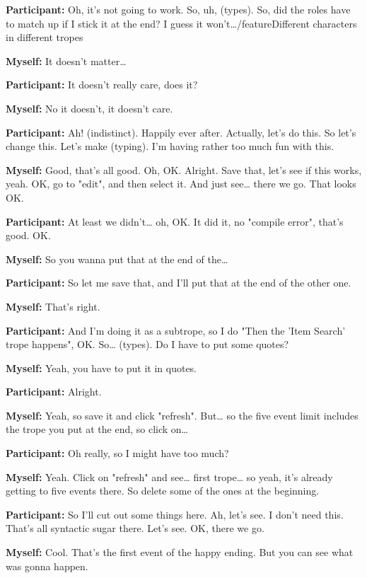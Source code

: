 \documentclass[11pt]{report}
\begin{document}
\begin{linenumbers}
\textbf{Participant:} Oh, it's not going to work. So, uh, (types). So, did the
roles have to match up if I stick it at the end? I guess it
won't\ldots{}/feature{Different characters in different tropes}

\textbf{Myself:} It doesn't matter\ldots{}

\textbf{Participant:} It doesn't really care, does it?

\textbf{Myself:} No it doesn't, it doesn't care.

\textbf{Participant:} Ah! (indistinct). Happily ever after. Actually, let's do this. So let's change this. Let's make (typing). I'm having rather too much fun with this.

\textbf{Myself:} Good, that's all good. Oh, OK. Alright. Save that, let's see if this works, yeah. OK, go to "edit", and then select it. And just see\ldots{} there we go. That looks OK.

\textbf{Participant:} At least we didn't\ldots{} oh, OK. It did it, no "compile error", that's good. OK.

\textbf{Myself:} So you wanna put that at the end of the\ldots{}

\textbf{Participant:} So let me save that, and I'll put that at the end of the other one.

\textbf{Myself:} That's right.

\textbf{Participant:} And I'm doing it as a subtrope, so I do "Then the 'Item Search' trope happens", OK. So\ldots{} (types). Do I have to put some quotes?

\textbf{Myself:} Yeah, you have to put it in quotes.

\textbf{Participant:} Alright.

\textbf{Myself:} Yeah, so save it and click "refresh". But\ldots{} so the five
event limit includes the trope you put at the end, so click on\ldots{}

\textbf{Participant:} Oh really, so I might have too much?

\textbf{Myself:} Yeah. Click on "refresh" and see\ldots{} first trope\ldots{} so yeah, it's already getting to five events there. So delete some of the ones at the beginning.

\textbf{Participant:} So I'll cut out some things here. Ah, let's see. I don't need this. That's all syntactic sugar there. Let's see. OK, there we go.

\textbf{Myself:} Cool. That's the first event of the happy ending. But you can see what was gonna happen.


\end{linenumbers}
\end{document}
